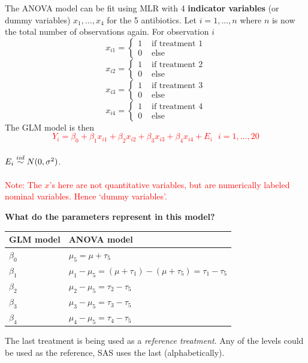 The ANOVA model can be fit using MLR with 4 {\bf indicator variables} (or dummy variables) $x_1,\ldots,x_4$ for the 5 antibiotics.  Let $i=1,...,n$ where $n$ is now the total number of observations again.  For observation $i$
\[ 
x_{i1} = 
\begin{cases} 1 & \text{ if treatment }1 \\
0 & \text{ else } 
\end{cases}
\]
\[ 
x_{i2} = 
\begin{cases} 1 & \text{ if treatment }2 \\
0 & \text{ else } 
\end{cases}
\]
\[ 
x_{i3} = 
\begin{cases} 1 & \text{ if treatment }3 \\
0 & \text{ else } 
\end{cases}
\]
\[ 
x_{i4} = 
\begin{cases} 1 & \text{ if treatment }4 \\
0 & \text{ else } 
\end{cases}
\]
The GLM model is then %
\textcolor{red}{$$ Y_{i} = \beta_0 + \beta_1 x_{i1} + \beta_2 x_{i2}+ \beta_3 x_{i3}+ \beta_4 x_{i4} + E_{i} \ \ \ i=1,\ldots,20$$}~\\
$E_{i} \stackrel{iid}{\sim} N(0,\sigma^2)$.\\~\\
\textcolor{red}{Note: The $x$'s here are not quantitative variables, but are numerically labeled nominal variables.  Hence `dummy variables'.}

\newpage

\textbf{What do the parameters represent in this model?}\\
\begin{center}
\begin{tabular}{l|l}
GLM model & ANOVA model \\\hline
$\beta_0$ & $\mu_5=\mu+\tau_5$\\
$\beta_1$ & $\mu_1-\mu_5=(\mu+\tau_1)-(\mu+\tau_5)=\tau_1-\tau_5$\\
$\beta_2$ & $\mu_2-\mu_5=\tau_2-\tau_5$\\
$\beta_3$ & $\mu_3-\mu_5=\tau_3-\tau_5$\\
$\beta_4$ & $\mu_4-\mu_5=\tau_4-\tau_5$\\
\end{tabular}
\end{center}
The last treatment is being used as a \textit{reference treatment}.  Any of the levels could be used as the reference, SAS uses the last (alphabetically).\\~\\


